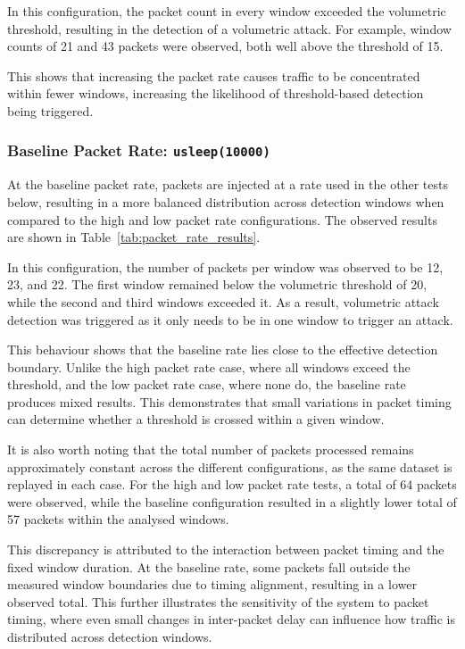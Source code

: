 In this configuration, the packet count in every window exceeded the volumetric
threshold, resulting in the detection of a volumetric attack. For example,
window counts of 21 and 43 packets were observed, both well above the threshold
of 15.

This shows that increasing the packet rate causes traffic to be concentrated
within fewer windows, increasing the likelihood of threshold-based detection
being triggered.

\subsubsection{Baseline Packet Rate: \texttt{usleep(10000)}}
At the baseline packet rate, packets are injected at a rate used in the other tests below,
resulting in a more balanced distribution across detection windows when compared
to the high and low packet rate configurations. The observed results are shown
in Table~\ref{tab:packet_rate_results}.

In this configuration, the number of packets per window was observed to be 12,
23, and 22. The first window remained below the volumetric threshold of 20,
while the second and third windows exceeded it. As a result, volumetric attack
detection was triggered as it only needs to be in one window to trigger an
attack.

This behaviour shows that the baseline rate lies close to the effective
detection boundary. Unlike the high packet rate case, where all windows exceed
the threshold, and the low packet rate case, where none do, the baseline rate
produces mixed results. This demonstrates that small variations in packet
timing can determine whether a threshold is crossed within a given window.

It is also worth noting that the total number of packets processed remains
approximately constant across the different configurations, as the same dataset
is replayed in each case. For the high and low packet rate tests, a total of 64
packets were observed, while the baseline configuration resulted in a slightly
lower total of 57 packets within the analysed windows.

This discrepancy is attributed to the interaction between packet timing and the
fixed window duration. At the baseline rate, some packets fall outside the
measured window boundaries due to timing alignment, resulting in a lower
observed total. This further illustrates the sensitivity of the system to
packet timing, where even small changes in inter-packet delay can influence how
traffic is distributed across detection windows.

